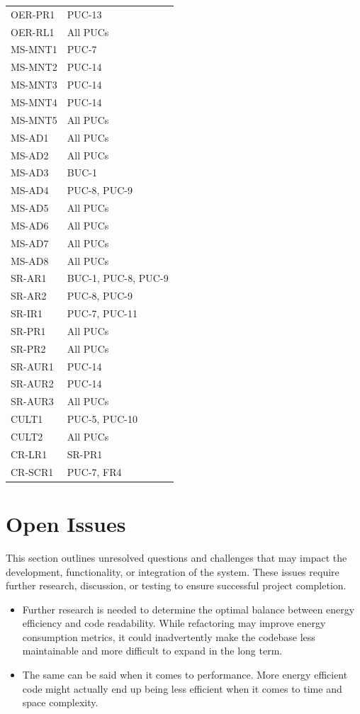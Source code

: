 \documentclass[12pt]{article}
\begin{document}
\begin{longtable}{p{2.5cm}p{11cm}}
  OER-PR1 & PUC-13 \\
  OER-RL1 & All PUCs \\
  MS-MNT1 & PUC-7 \\
  MS-MNT2 & PUC-14 \\
  MS-MNT3 & PUC-14 \\
  MS-MNT4 & PUC-14 \\
  MS-MNT5 & All PUCs \\
  MS-AD1 & All PUCs \\
  MS-AD2 & All PUCs \\
  MS-AD3 & BUC-1 \\
  MS-AD4 & PUC-8, PUC-9 \\
  MS-AD5 & All PUCs \\
  MS-AD6 & All PUCs \\
  MS-AD7 & All PUCs \\
  MS-AD8 & All PUCs \\
  SR-AR1 & BUC-1, PUC-8, PUC-9 \\
  SR-AR2 & PUC-8, PUC-9 \\
  SR-IR1 & PUC-7, PUC-11 \\
  SR-PR1 & All PUCs \\
  SR-PR2 & All PUCs \\
  SR-AUR1 & PUC-14 \\
  SR-AUR2 & PUC-14 \\
  SR-AUR3 & All PUCs \\
  CULT1 & PUC-5, PUC-10 \\
  CULT2 & All PUCs \\
  CR-LR1 & SR-PR1 \\
  CR-SCR1 & PUC-7, FR4 \\
\end{longtable}

\section{Open Issues}

This section outlines unresolved questions and challenges that may
impact the development, functionality, or integration of the system.
These issues require further research, discussion, or testing to
ensure successful project completion.\\

\begin{itemize}
  \item Further research is needed to determine the optimal balance
    between energy efficiency and code readability. While refactoring
    may improve energy consumption metrics, it could inadvertently
    make the codebase less maintainable and more difficult to expand
    in the long term.
  \item The same can be said when it comes to performance. More
    energy efficient code might actually end up being less efficient
    when it comes to time and space complexity.
\end{itemize}
\end{document}
